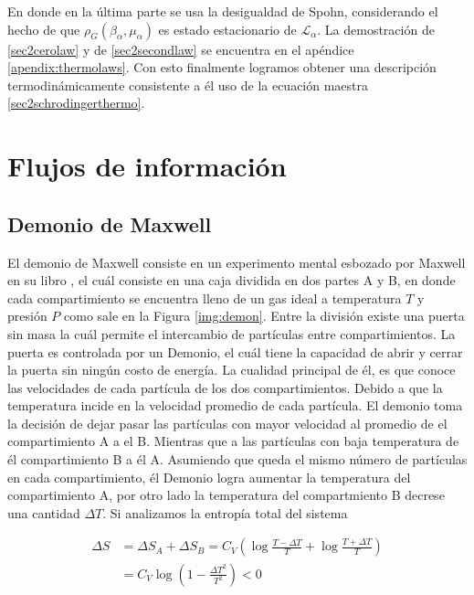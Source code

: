 En donde en la última parte se usa la desigualdad de Spohn\cite{spohn2007irreversible}, considerando el hecho de que $\rho_{G}(\beta_{\alpha},\mu_{\alpha})$ es estado estacionario de $\mathcal{L}_{\alpha}$. La demostración de \ref{sec2cerolaw} y de \ref{sec2secondlaw} se encuentra en el apéndice \ref{apendix:thermolaws}. Con esto finalmente logramos obtener una descripción termodinámicamente consistente a él uso de la ecuación maestra \ref{sec2schrodingerthermo}.


\chapter{Flujos de información}
\section{Demonio de Maxwell}
El demonio de Maxwell consiste en un experimento mental esbozado por Maxwell en su libro \cite{Maxwell_1871}, el cuál consiste en una caja dividida en dos partes A y B, en donde cada compartimiento se encuentra lleno de un gas ideal a temperatura $T$ y presión $P$ como sale en la Figura \ref{img:demon}. Entre la división existe una puerta sin masa la cuál permite el intercambio de partículas entre compartimientos. La puerta es controlada por un Demonio, el cuál tiene la capacidad de abrir y cerrar la puerta sin ningún costo de energía. La cualidad principal de él, es que conoce las velocidades de cada partícula de los dos compartimientos. Debido a que la temperatura incide en la velocidad promedio de cada partícula. El demonio toma la decisión de dejar pasar las partículas con mayor velocidad al promedio de el compartimiento A a el B. Mientras que a las partículas con baja temperatura de él compartimiento B a él A. Asumiendo que queda el mismo número de partículas en cada compartimiento, él Demonio logra aumentar la temperatura del compartimiento A, por otro lado la temperatura del compartmiento B decrese una cantidad $\Delta T$. Si analizamos la entropía total del sistema


\begin{align*}
    \Delta S & = \Delta S_{A} + \Delta S_{B} = C_{V}\left( \log \frac{T-\Delta T}{T} + \log \frac{T+\Delta T}{T} \right) \\
       & =  C_{V} \log \left( 1 - \frac{\Delta T^{2}}{T^{2}}  \right) < 0
\end{align*}

